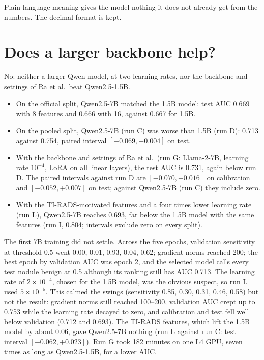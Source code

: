 Plain-language meaning gives the model nothing it does not already get from the numbers. The
decimal format is kept.

\section{Does a larger backbone help?}
\label{sec:results-size}

No: neither a larger Qwen model, at two learning rates, nor the backbone and settings of Ra et al.\
beat Qwen2.5-1.5B.

\begin{itemize}
  \item On the official split, Qwen2.5-7B matched the 1.5B model: test AUC 0.669 with 8 features
        and 0.666 with 16, against 0.667 for 1.5B.
  \item On the pooled split, Qwen2.5-7B (run C) was worse than 1.5B (run D): 0.713 against 0.754,
        paired interval $[-0.069, -0.004]$ on test.
  \item With the backbone and settings of Ra et al.\ (run G: Llama-2-7B, learning rate
        $10^{-4}$, LoRA on all linear layers), the test AUC is 0.731, again below run D. The
        paired intervals against run D are $[-0.070, -0.016]$ on calibration and
        $[-0.052, +0.007]$ on test; against Qwen2.5-7B (run C) they include zero.
  \item With the TI-RADS-motivated features and a four times lower learning rate (run L),
        Qwen2.5-7B reaches 0.693, far below the 1.5B model with the same features (run I, 0.804;
        intervals exclude zero on every split).
\end{itemize}

The first 7B training did not settle. Across the five epochs, validation sensitivity at threshold
0.5 went 0.00, 0.01, 0.93, 0.04, 0.62; gradient norms reached 200; the best epoch by validation AUC
was epoch 2, and the selected model calls every test nodule benign at 0.5 although its ranking
still has AUC 0.713. The learning rate of $2 \times 10^{-4}$, chosen for the 1.5B model, was the
obvious suspect, so run L used $5 \times 10^{-5}$. This calmed the swings (sensitivity 0.85, 0.30,
0.31, 0.46, 0.58) but not the result: gradient norms still reached 100--200, validation AUC crept
up to 0.753 while the learning rate decayed to zero, and calibration and test fell well below
validation (0.712 and 0.693). The TI-RADS features, which lift the 1.5B model by about 0.06, gave
Qwen2.5-7B nothing (run L against run C: test interval $[-0.062, +0.023]$). Run G took 182
minutes on one L4 GPU, seven times as long as Qwen2.5-1.5B, for a lower AUC.

